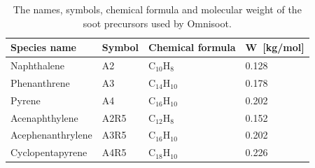 \begin{enumerate}
	\renewcommand{\arraystretch}{1.5}
	\begin{table}
		\caption{The names, symbols, chemical formula and molecular weight of the soot precursors used by Omnisoot.}
		\label{tab:precursors_list}
		\centering
		\begin{tabular}{l l l l}
			\hline
			Species name & Symbol & Chemical formula & W~[kg/mol] \\
			\hline
			Naphthalene       & A2   &  $\mathrm{C_{10}H_{8}}$   & 0.128 \\
			Phenanthrene      & A3   &  $\mathrm{C_{14}H_{10}}$  & 0.178 \\
			Pyrene            & A4   &  $\mathrm{C_{16}H_{10}}$  & 0.202 \\
			Acenaphthylene    & A2R5 &  $\mathrm{C_{12}H_{8}}$   & 0.152 \\
			Acephenanthrylene & A3R5 &  $\mathrm{C_{16}H_{10}}$  & 0.202 \\
			Cyclopentapyrene  & A4R5 &  $\mathrm{C_{18}H_{10}}$  & 0.226 \\
			\hline
		\end{tabular}
	\end{table}
	
\end{enumerate}

